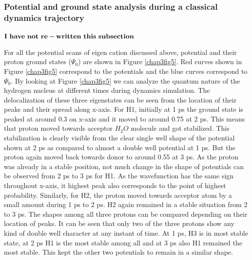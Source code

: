 \subsubsection{Potential and ground state analysis during a classical dynamics trajectory}
$\bf{I~ have~ not~ re-written~ this~ subsection}$

For all the potential scans of eigen cation discussed above, potential and their proton ground states
($\Psi_{0}$) are shown in Figure \ref{chap3fig5}. Red curves shown in Figure \ref{chap3fig5}
correspond to the potentials and the blue curves correspond to $\Psi_{0}$. By looking at Figure
\ref{chap3fig5} we can analyze the quantum nature of the hydrogen nucleus at different times
during dynamics simulation. The delocalization of these three eigenstates can be seen from the
location of their peaks and their spread along x-axis. For H1, initially at 1 ps the ground state
is peaked at around 0.3 on x-axis and it moved to around 0.75 at 2 ps. This means that proton
moved towards acceptor $H_2O$ molecule and got stabilized. This stabilization is clearly visible
from the clear single well shape of the potential shown at 2 ps as compared to almost a double well
potential at 1 ps. But the proton again moved back towards donor to around 0.55 at 3 ps. As the
proton was already in a stable position, not much change in the shape of potentials can be
observed from 2 ps to 3 ps for H1. As the wavefunction has the same sign throughout x-axis,
it highest peak also corresponds to the point of highest probability. Similarly, for H2, the
proton moved towards acceptor atom by a small amount during 1 ps to 2 ps. H2 again remained in a
stable situation from 2 to 3 ps. The shapes among all three protons can be compared depending
on their location of peaks. It can be seen that only two of the three protons show any kind
of double well character at any instant of time. At 1 ps, H3 is in most stable state, at 2 ps
H1 is the most stable among all and at 3 ps also H1 remained the most stable. This kept the
other two potentials to remain in a similar shape.


